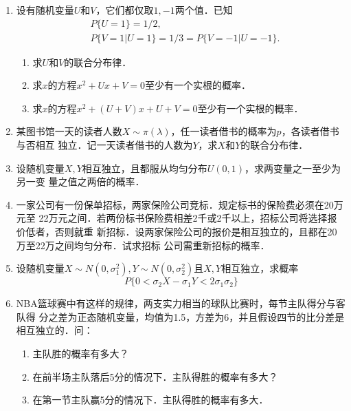 \documentclass[10pt,a4paper]{article}
\begin{document}
\begin{enumerate}
    \item 设有随机变量$U$和$V$，它们都仅取$1,-1$两个值．已知
    \begin{equation}
        \begin{split}
            & P\{U=1\}=1/2,\\
            & P\{V=1|U=1\}=1/3=P\{V=-1|U=-1\}.
        \end{split}
        \nonumber
    \end{equation}
    \begin{enumerate}
        \item 求$U$和$V$的联合分布律．
        \item 求$x$的方程$x^2+Ux+V=0$至少有一个实根的概率．
        \item 求$x$的方程$x^2+(U+V)x+U+V=0$至少有一个实根的概率．
    \end{enumerate}
    \clearpage



    \item 某图书馆一天的读者人数$X\sim \pi(\lambda)$，任一读者借书的概率为$p$，各读者借书与否相互
    独立．记一天读者借书的人数为$Y$，求$X$和$Y$的联合分布律．
    \clearpage



    \item 设随机变量$X,Y$相互独立，且都服从均匀分布$U(0,1)$，求两变量之一至少为另一变
    量之值之两倍的概率．
    \clearpage


    \item 一家公司有一份保单招标，两家保险公司竞标．规定标书的保险费必须在20万元至
    22万元之间．若两份标书保险费相差2千或2千以上，招标公司将选择报价低者，否则就重
    新招标．设两家保险公司的报价是相互独立的，且都在20万至22万之间均匀分布．试求招标
    公司需重新招标的概率．
    \clearpage


    \item 设随机变量$X\sim N(0,\sigma_1^2),Y\sim N(0,\sigma_2^2)$且$X,Y$相互独立，求概率
    $$P\{0<\sigma_2 X -\sigma_1 Y<2\sigma_1\sigma_2\}$$
    \clearpage



    \item NBA篮球赛中有这样的规律，两支实力相当的球队比赛时，每节主队得分与客队得
    分之差为正态随机变量，均值为1.5，方差为6，并且假设四节的比分差是相互独立的．问：
    \begin{enumerate}
        \item 主队胜的概率有多大？
        \item 在前半场主队落后5分的情况下．主队得胜的概率有多大？
        \item 在第一节主队赢5分的情况下．主队得胜的概率有多大．
    \end{enumerate}
    \clearpage




\end{enumerate}
\end{document}
